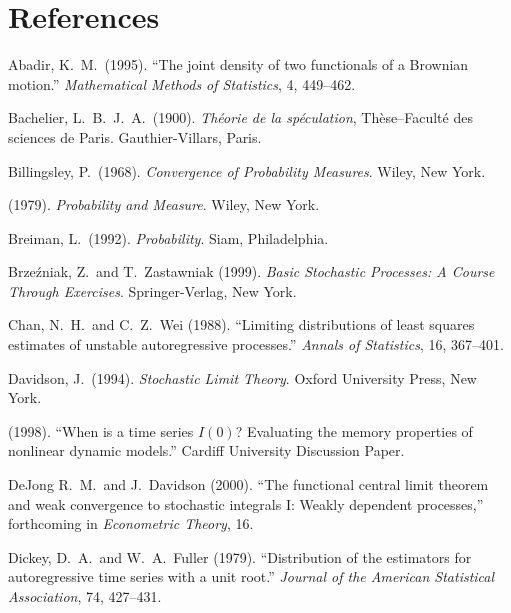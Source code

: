 \section*{References}

\begin{description}
\item Abadir, K.\ M.\ (1995). ``The joint density of two functionals of a Brownian motion.'' \emph{Mathematical Methods of Statistics}, 4, 449--462.

\item Bachelier, L.\ B.\ J.\ A.\ (1900). \emph{Th\'{e}orie de la sp\'{e}culation}, Th\`{e}se--Facult\'{e} des sciences de Paris. Gauthier-Villars, Paris.

\item Billingsley, P.\ (1968). \emph{Convergence of Probability Measures}. Wiley, New York.

\item[] \hspace{2em} (1979). \emph{Probability and Measure}. Wiley, New York.

\item Breiman, L.\ (1992). \emph{Probability}. Siam, Philadelphia.

\item Brze\'{z}niak, Z.\ and T.\ Zastawniak (1999). \emph{Basic Stochastic Processes: A Course Through Exercises}. Springer-Verlag, New York.

\item Chan, N.\ H.\ and C.\ Z.\ Wei (1988). ``Limiting distributions of least squares estimates of unstable autoregressive processes.'' \emph{Annals of Statistics}, 16, 367--401.

\item Davidson, J.\ (1994). \emph{Stochastic Limit Theory}. Oxford University Press, New York.

\item[] \hspace{2em} (1998). ``When is a time series $I(0)$? Evaluating the memory properties of nonlinear dynamic models.'' Cardiff University Discussion Paper.

\item DeJong R.\ M.\ and J.\ Davidson (2000). ``The functional central limit theorem and weak convergence to stochastic integrals I: Weakly dependent processes,'' forthcoming in \emph{Econometric Theory}, 16.

\item Dickey, D.\ A.\ and W.\ A.\ Fuller (1979). ``Distribution of the estimators for autoregressive time series with a unit root.'' \emph{Journal of the American Statistical Association}, 74, 427--431.


\end{description}
